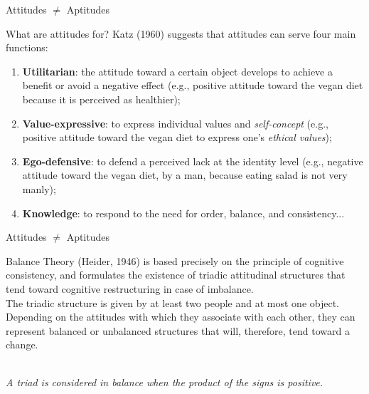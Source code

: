 \documentclass{beamer}
\begin{document}
\begin{frame}{Attitudes $\neq$ Aptitudes}
    \begin{block}{What are attitudes for?}
        Katz (1960) suggests that attitudes can serve four main functions: \\
        \small
    \begin{enumerate}
        \item \textbf{Utilitarian}: the attitude toward a certain object develops to achieve a benefit or avoid a negative effect (e.g., positive attitude toward the vegan diet because it is perceived as healthier);
        \item \textbf{Value-expressive}: to express individual values and \textit{self-concept} (e.g., positive attitude toward the vegan diet to express one's \textit{ethical values});
        \item \textbf{Ego-defensive}: to defend a perceived lack at the identity level (e.g., negative attitude toward the vegan diet, by a man, because eating salad is not very manly); 
        \item \textbf{Knowledge}: to respond to the need for order, balance, and consistency...
    \end{enumerate}
    \end{block}
\end{frame}

\begin{frame}{Attitudes $\neq$ Aptitudes}
    \footnotesize
    \begin{block}{Balance Theory (Heider, 1946)}
        is based precisely on the principle of cognitive consistency, and formulates the existence of triadic attitudinal structures that tend toward cognitive restructuring in case of imbalance. \\
        The triadic structure is given by at least two people and at most one object. Depending on the attitudes with which they associate with each other, they can represent balanced or unbalanced structures that will, therefore, tend toward a change. \\
        \vspace{0.5em}
        \centering
        \\
        \vspace{0.5em}
        \textit{\scriptsize A triad is considered in balance when the product of the signs is positive.} \\
    \end{block}
\end{frame}
\end{document}
